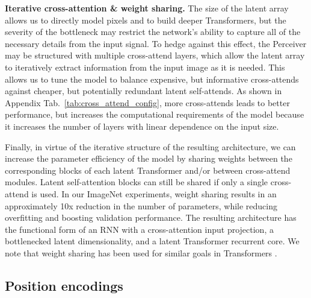 \documentclass{article}
\begin{document}
\noindent \textbf{Iterative cross-attention \& weight sharing.}
The size of the latent array allows us to directly model pixels and to build deeper Transformers, but the severity of the bottleneck may restrict the network's ability to capture all of the necessary details from the input signal. To hedge against this effect, the Perceiver may be structured with multiple cross-attend layers, which allow the latent array to iteratively extract information from the input image as it is needed. This allows us to tune the model to balance expensive, but informative cross-attends against cheaper, but potentially redundant latent self-attends. As shown in Appendix Tab.~\ref{tab:cross_attend_config}, more cross-attends leads to better performance, but increases the computational requirements of the model because it increases the number of layers with linear dependence on the input size.

Finally, in virtue of the iterative structure of the resulting architecture, we can increase the parameter efficiency of the model by sharing weights between the corresponding blocks of each latent Transformer and/or between cross-attend modules. Latent self-attention blocks can still be shared if only a single cross-attend is used. In our ImageNet experiments, weight sharing results in an approximately 10x reduction in the number of parameters, while reducing overfitting and boosting validation performance. The resulting architecture has the functional form of an RNN with a cross-attention input projection, a bottlenecked latent dimensionality, and a latent Transformer recurrent core. We note that weight sharing has been used for similar goals in Transformers \cite{dehghani2019universal, lan2020albert}.

\subsection{Position encodings}
\label{sec:pos_encodings}
\end{document}
